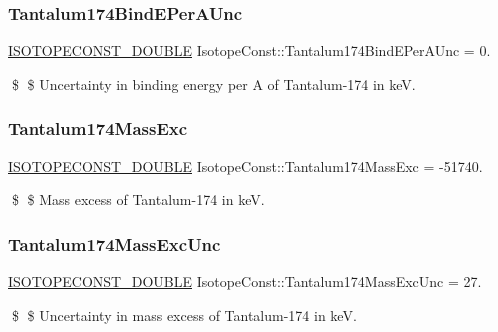 \subsubsection{\texorpdfstring{Tantalum174\+Bind\+E\+Per\+A\+Unc}{Tantalum174BindEPerAUnc}}
{\footnotesize\ttfamily \mbox{\hyperlink{group___isotope_const-_macros_ga8f45a7272ce02c0b4c65c44636ed719a}{I\+S\+O\+T\+O\+P\+E\+C\+O\+N\+S\+T\+\_\+\+D\+O\+U\+B\+LE}} Isotope\+Const\+::\+Tantalum174\+Bind\+E\+Per\+A\+Unc = 0.}

\$ \$ Uncertainty in binding energy per A of Tantalum-\/174 in keV. \mbox{\label{group___isotope_const-_tantalum-_ta174_gaa175f2eac83c3bb587e0e38f9d4d44f2}} 
\subsubsection{\texorpdfstring{Tantalum174\+Mass\+Exc}{Tantalum174MassExc}}
{\footnotesize\ttfamily \mbox{\hyperlink{group___isotope_const-_macros_ga8f45a7272ce02c0b4c65c44636ed719a}{I\+S\+O\+T\+O\+P\+E\+C\+O\+N\+S\+T\+\_\+\+D\+O\+U\+B\+LE}} Isotope\+Const\+::\+Tantalum174\+Mass\+Exc = -\/51740.}

\$ \$ Mass excess of Tantalum-\/174 in keV. \mbox{\label{group___isotope_const-_tantalum-_ta174_gabcc28e47443d4ffff348affd42d699d6}} 
\subsubsection{\texorpdfstring{Tantalum174\+Mass\+Exc\+Unc}{Tantalum174MassExcUnc}}
{\footnotesize\ttfamily \mbox{\hyperlink{group___isotope_const-_macros_ga8f45a7272ce02c0b4c65c44636ed719a}{I\+S\+O\+T\+O\+P\+E\+C\+O\+N\+S\+T\+\_\+\+D\+O\+U\+B\+LE}} Isotope\+Const\+::\+Tantalum174\+Mass\+Exc\+Unc = 27.}

\$ \$ Uncertainty in mass excess of Tantalum-\/174 in keV. \mbox{\label{group___isotope_const-_tantalum-_ta174_ga6c6c158e1b439ca5400350738d6df4cc}} 
